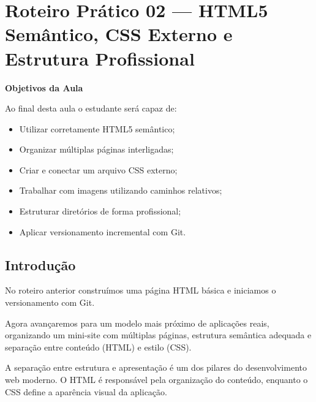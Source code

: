 \documentclass[12pt,a4paper]{article}
\begin{document}
\newpage





\section{Roteiro Prático 02 — HTML5 Semântico, CSS Externo e Estrutura Profissional}


\begin{boxObjetivos}
\textbf{Objetivos da Aula}

Ao final desta aula o estudante será capaz de:

\begin{itemize}
\item Utilizar corretamente HTML5 semântico;
\item Organizar múltiplas páginas interligadas;
\item Criar e conectar um arquivo CSS externo;
\item Trabalhar com imagens utilizando caminhos relativos;
\item Estruturar diretórios de forma profissional;
\item Aplicar versionamento incremental com Git.
\end{itemize}
\end{boxObjetivos}


\subsection{Introdução}

No roteiro anterior construímos uma página HTML básica e iniciamos o versionamento com Git.

Agora avançaremos para um modelo mais próximo de aplicações reais, organizando um mini-site com múltiplas páginas, estrutura semântica adequada e separação entre conteúdo (HTML) e estilo (CSS).

A separação entre estrutura e apresentação é um dos pilares do desenvolvimento web moderno. O HTML é responsável pela organização do conteúdo, enquanto o CSS define a aparência visual da aplicação.
\end{document}
